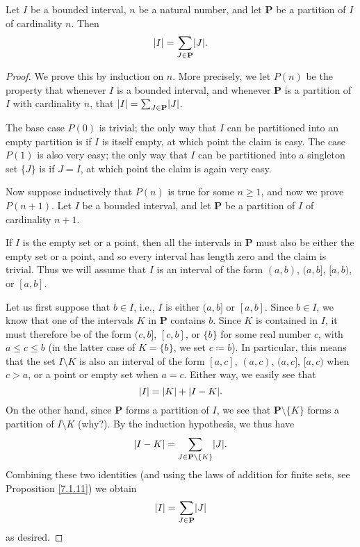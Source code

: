 \setcounter{theorem}{12}
\begin{theorem}\label{11.1.13}
    Let \(I\) be a bounded interval, \(n\) be a natural number, and let \(\mathbf{P}\) be a partition of \(I\) of cardinality \(n\).
    Then
    \[
        \abs*{I} = \sum_{J \in \mathbf{P}} \abs*{J}.
    \]
\end{theorem}

\begin{proof}
    We prove this by induction on \(n\).
    More precisely, we let \(P(n)\) be the property that whenever \(I\) is a bounded interval, and whenever \(\mathbf{P}\) is a partition of \(I\) with cardinality \(n\), that \(\abs*{I} = \sum_{J \in \mathbf{P}} \abs*{J}\).

    The base case \(P(0)\) is trivial;
    the only way that \(I\) can be partitioned into an empty partition is if \(I\) is itself empty, at which point the claim is easy.
    The case \(P(1)\) is also very easy;
    the only way that \(I\) can be partitioned into a singleton set \(\{J\}\) is if \(J = I\), at which point the claim is again very easy.

    Now suppose inductively that \(P(n)\) is true for some \(n \geq 1\), and now we prove \(P(n + 1)\).
    Let \(I\) be a bounded interval, and let \(\mathbf{P}\) be a partition of \(I\) of cardinality \(n + 1\).

    If \(I\) is the empty set or a point, then all the intervals in \(\mathbf{P}\) must also be either the empty set or a point, and so every interval has length zero and the claim is trivial.
    Thus we will assume that \(I\) is an interval of the form \((a, b)\), \((a, b]\), \([a, b)\), or \([a, b]\).

            Let us first suppose that \(b \in I\), i.e., \(I\) is either \((a, b]\) or \([a, b]\).
    Since \(b \in I\), we know that one of the intervals \(K\) in \(\mathbf{P}\) contains \(b\).
    Since \(K\) is contained in \(I\), it must therefore be of the form \((c, b]\), \([c, b]\), or \(\{b\}\) for some real number \(c\), with \(a \leq c \leq b\) (in the latter case of \(K = \{b\}\), we set \(c \coloneqq b\)).
    In particular, this means that the set \(I \setminus K\) is also an interval of the form \([a, c]\), \((a, c)\), \((a, c]\), \([a, c)\) when \(c > a\), or a point or empty set when \(a = c\).
    Either way, we easily see that
    \[
        \abs*{I} = \abs*{K} + \abs*{I - K}.
    \]
    On the other hand, since \(\mathbf{P}\) forms a partition of \(I\), we see that \(\mathbf{P} \setminus \{K\}\) forms a partition of \(I \setminus K\) (why?).
    By the induction hypothesis, we thus have
    \[
        \abs*{I - K} = \sum_{J \in \mathbf{P} \setminus \{K\}} \abs*{J}.
    \]
    Combining these two identities (and using the laws of addition for finite sets, see Proposition \ref{7.1.11}) we obtain
    \[
        \abs*{I} = \sum_{J \in \mathbf{P}} \abs*{J}
    \]
    as desired.


\end{proof}

